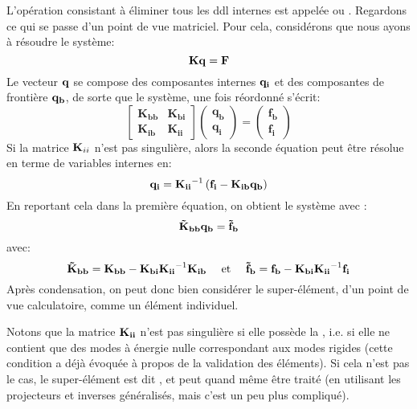L'opération consistant à éliminer tous les ddl internes est appelée
 ou .
\medskip
Regardons ce qui se passe d'un point de vue matriciel.
Pour cela, considérons que nous ayons à résoudre le système:
\begin{equation}  \mathbf{K} \mathbf{q}=\mathbf{F}\end{equation}
Le vecteur $\mathbf{q}$ se compose des composantes internes $\mathbf{q_i}$ et des composantes
de frontière $\mathbf{q_b}$, de sorte que le système, une fois réordonné s'écrit:
\begin{equation}
\begin{bmatrix}
\mathbf{K_{bb}} & \mathbf{K_{bi}}\\
\mathbf{K_{ib}} & \mathbf{K_{ii}}
\end{bmatrix}
\begin{pmatrix}
\mathbf{q_b}\\\mathbf{q_i}
\end{pmatrix}
=
\begin{pmatrix}
\mathbf{f_b}\\\mathbf{f_i}
\end{pmatrix}
\end{equation}
Si la matrice $\mathbf{K}_{ii}$ n'est pas singulière, alors la seconde équation peut être
résolue en terme de variables internes en:
\begin{equation}
\mathbf{q_i} = \mathbf{K_{ii}}^{-1}\left(\mathbf{f_i}-\mathbf{K_{ib}}\mathbf{q_b}\right)
\end{equation}
En reportant cela dans la première équation, on obtient le système avec :
\begin{equation}
\mathbf{\tilde{K}_{bb}}\mathbf{q_b} = \mathbf{\tilde{f}_b}
\end{equation}
avec:
\begin{equation}
\mathbf{\tilde{K}_{bb}}=\mathbf{K_{bb}} - \mathbf{K_{bi}}\mathbf{K_{ii}}^{-1}\mathbf{K_{ib}}
\quad \text{ et }\quad
\mathbf{\tilde{f}_b}=\mathbf{f_b} - \mathbf{K_{bi}}\mathbf{K_{ii}}^{-1}\mathbf{f_i}
\end{equation}
Après condensation, on peut donc bien considérer le super-élément, d'un point de vue calculatoire,
comme un élément individuel.

\medskip
Notons que la matrice $\mathbf{K_{ii}}$ n'est pas singulière si elle possède la , i.e. si elle ne contient que des modes à énergie nulle correspondant aux
modes rigides (cette condition a déjà évoquée à propos de la validation des éléments).
Si cela n'est pas le cas, le super-élément est dit , et
peut quand même être traité (en utilisant les projecteurs et inverses généralisés,
mais c'est un peu plus compliqué).

